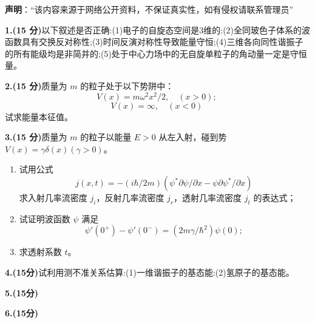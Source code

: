 
\textbf{声明}：“该内容来源于网络公开资料，不保证真实性，如有侵权请联系管理员”

\textbf{1.(15 分)}以下叙述是否正确:(1)电子的自旋态空间是3维的:(2)全同玻色子体系的波函数具有交换反对称性;(3)时间反演对称性导致能量守恒;(4)三维各向同性谐振子的所有能级均是非简并的;(5)处于中心力场中的无自旋单粒子的角动量一定是守恒量。

\textbf{2.(15 分)}质量为 $m$ 的粒子处于以下势阱中：
\[
V(x) = m \omega^2 x^2/2, \quad (x > 0);~
\]
\[
V(x) = \infty, \quad (x < 0)~
\]
试求能量本征值。

\textbf{3.(15 分)}质量为 $m$ 的粒子以能量 $E > 0$ 从左入射，碰到势 $V(x) = \gamma \delta(x) (\gamma > 0)$。

\begin{enumerate}
    \item 试用公式
    \[
    j(x,t) = -(i\hbar/2m)(\psi^* \partial \psi/\partial x - \psi \partial \psi^*/\partial x)~
    \]
    求入射几率流密度 $j_i$，反射几率流密度 $j_r$，透射几率流密度 $j_t$ 的表达式；
    
    \item 试证明波函数 $\psi$ 满足
    \[
    \psi'(0^+) - \psi'(0^-) = (2m\gamma/\hbar^2)\psi(0);~
    \]
    
    \item 求透射系数 $t$。
\end{enumerate}

\textbf{4.(15分)}试利用测不准关系估算:(1)一维谐振子的基态能:(2)氢原子的基态能。


\textbf{5.(15分)}


\textbf{6.(15分)}
